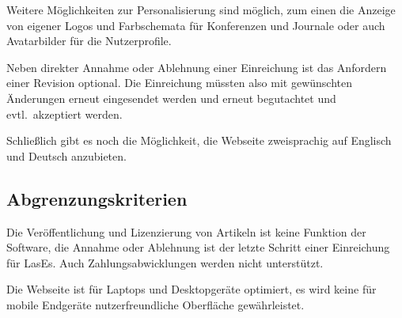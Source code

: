 Weitere Möglichkeiten zur Personalisierung sind möglich,
zum einen die Anzeige von eigener Logos und Farbschemata für Konferenzen und Journale oder auch Avatarbilder für die Nutzerprofile.

Neben direkter Annahme oder Ablehnung einer Einreichung ist das Anfordern einer Revision optional.
Die Einreichung müssten also mit gewünschten Änderungen erneut eingesendet werden und erneut begutachtet und evtl.\ akzeptiert werden.

Schließlich gibt es noch die Möglichkeit, die Webseite zweisprachig auf Englisch und Deutsch anzubieten.

\subsection{Abgrenzungskriterien}

Die Veröffentlichung und Lizenzierung von Artikeln ist keine Funktion der Software,
die Annahme oder Ablehnung ist der letzte Schritt einer Einreichung für LasEs.
Auch Zahlungsabwicklungen werden nicht unterstützt.

Die Webseite ist für Laptops und Desktopgeräte optimiert, es wird keine für mobile Endgeräte nutzerfreundliche Oberfläche gewährleistet.